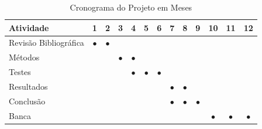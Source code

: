 \documentclass[
    12pt,                   %
    openright,              %
    oneside,                %
    a4paper,                %
    sumario=tradicional,    %
    english,                %
    brazil,                 %
    ]{abntex2}
\begin{document}
\begin{table}[htbp]
  \centering
    \caption[Cronograma Normal]{Cronograma do Projeto em Meses}
    \label{tab:cronograma}
    \begin{tabular}{lcccccccccccc} %
    \toprule
    \textbf{Atividade} & \textbf{1} & \textbf{2} & \textbf{3} & \textbf{4} & \textbf{5} & \textbf{6} & \textbf{7} & \textbf{8} & \textbf{9} & \textbf{10} & \textbf{11} & \textbf{12} \\
    \midrule
        Revisão Bibliográfica & $\bullet$ & $\bullet$ & & & & & & & & & & \\
        Métodos & & & $\bullet$ & $\bullet$ & & & & & & & & \\
        Testes & & & & $\bullet$ & $\bullet$ & $\bullet$ & & & & & & \\
        Resultados & & & & & & & $\bullet$ & $\bullet$ & & & & \\
        Conclusão & & & & & & & $\bullet$ & $\bullet$ & $\bullet$ & & & \\
        Banca & & & & & & &&&& $\bullet$ & $\bullet$ & $\bullet$ \\
    \bottomrule
    \end{tabular}
\end{table}


\postextual


%
\nocite{*}
\printbibliography

%
%
%
%
%
%
%
%
%
%
\end{document}
